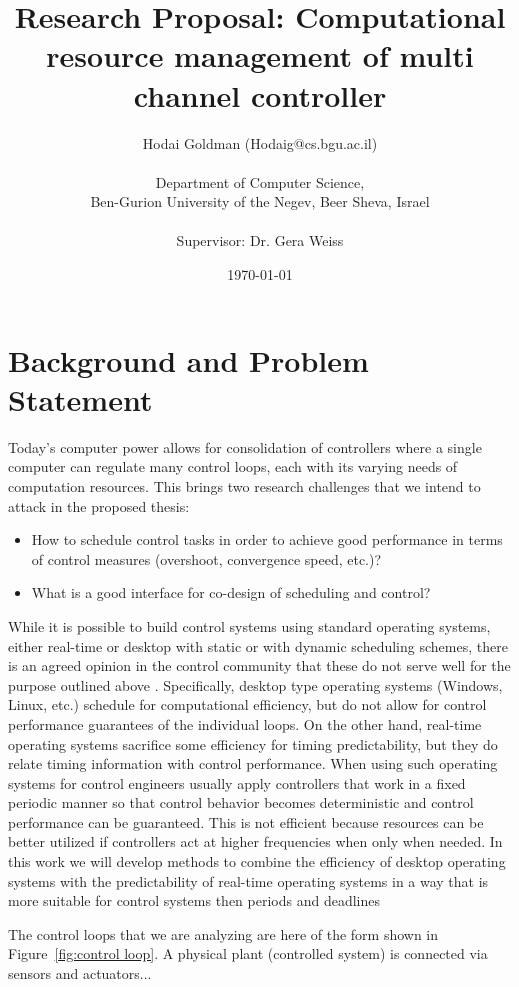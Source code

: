 \documentclass[11pt]{article}
\author{Hodai Goldman (Hodaig@cs.bgu.ac.il) \\ \\Department of Computer Science, \\Ben-Gurion University of the Negev, Beer Sheva, Israel \\ \\Supervisor: Dr. Gera Weiss}
\date{\today}
\title{Research Proposal: Computational resource management of multi channel controller}
\begin{document}
\begin{titlepage}
\maketitle
\end{titlepage}




\section{Background and Problem Statement}
\label{sec:Background}
Today's computer power allows for consolidation of controllers where a single computer can regulate many control loops, each with its varying needs of computation resources.
This brings two research challenges that we intend to attack in the proposed thesis:
\begin{itemize}
	\item How to schedule control tasks in order to achieve good performance in terms of control measures (overshoot, convergence speed, etc.)?
	\item What is a good interface for co-design of scheduling and control?
\end{itemize}

While it is possible to build control systems using standard operating systems, either real-time or desktop with static or with dynamic scheduling schemes, there is an agreed opinion in the control community that these do not serve well for the purpose outlined above \cite{??}. Specifically, desktop type operating systems (Windows, Linux, etc.) schedule for computational efficiency, but do not allow for control performance guarantees of the individual loops. On the other hand, real-time operating systems sacrifice some efficiency for timing predictability, but they do relate timing information with control performance. When using such operating systems for control engineers usually apply controllers that work in a fixed periodic manner so that control behavior becomes deterministic and control performance can be guaranteed. This is not efficient because resources can be better utilized if controllers act at higher frequencies when only when needed. 
In this work we will develop methods to combine the efficiency of desktop operating systems with the predictability of real-time operating systems in a way that is more suitable for control systems then periods and deadlines

The control loops that we are analyzing are here of the form shown in Figure~\ref{fig:control loop}. A physical plant (controlled system) is connected via sensors and actuators... %
\end{document}
